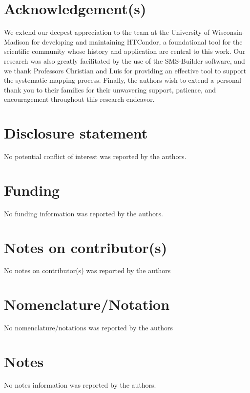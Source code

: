 \documentclass[]{interact}
\theoremstyle{plain}%
\theoremstyle{definition}
\theoremstyle{remark}
\begin{document}









\section*{Acknowledgement(s)}
We extend our deepest appreciation to the team at the University of Wisconsin-Madison for developing and maintaining HTCondor, a foundational tool for the scientific community whose history and application are central to this work. Our research was also greatly facilitated by the use of the SMS-Builder software, and we thank Professors Christian and Luis for providing an effective tool to support the systematic mapping process.
Finally, the authors wish to extend a personal thank you to their families for their unwavering support, patience, and encouragement throughout this research endeavor.

\section*{Disclosure statement}
No potential conflict of interest was reported by the authors.

\section*{Funding}
No funding information was reported by the authors.

\section*{Notes on contributor(s)}
No notes on contributor(s) was reported by the authors

\section*{Nomenclature/Notation}
No nomenclature/notations was reported by the authors

\section*{Notes}
No notes information was reported by the authors.










\end{document}
